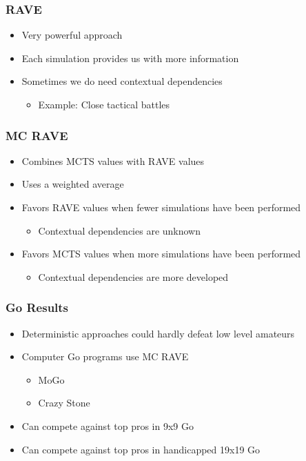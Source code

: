 \documentclass{beamer}
\begin{document}

\begin{frame}
\frametitle{RAVE}
\begin{itemize}
	\item Very powerful approach
	\item Each simulation provides us with more information
	\item Sometimes we do need contextual dependencies
	\begin{itemize}
		\item Example: Close tactical battles
	\end{itemize}
\end{itemize}
\end{frame}

\begin{frame}
\frametitle{MC RAVE}
\begin{itemize}
	\item Combines MCTS values with RAVE values
	\item Uses a weighted average
	\item Favors RAVE values when fewer simulations have been performed
	\begin{itemize}
		\item Contextual dependencies are unknown
	\end{itemize}
	\item Favors MCTS values when more simulations have been performed
	\begin{itemize}
		\item Contextual dependencies are more developed
	\end{itemize}
\end{itemize}
\end{frame}

\begin{frame}
\frametitle{Go Results}
\begin{itemize}
	\item Deterministic approaches could hardly defeat low level amateurs
	\item Computer Go programs use MC RAVE
	\begin{itemize}
		\item MoGo
		\item Crazy Stone
	\end{itemize}
	\item Can compete against top pros in 9x9 Go
	\item Can compete against top pros in handicapped 19x19 Go
\end{itemize}
\end{frame}
\end{document}
